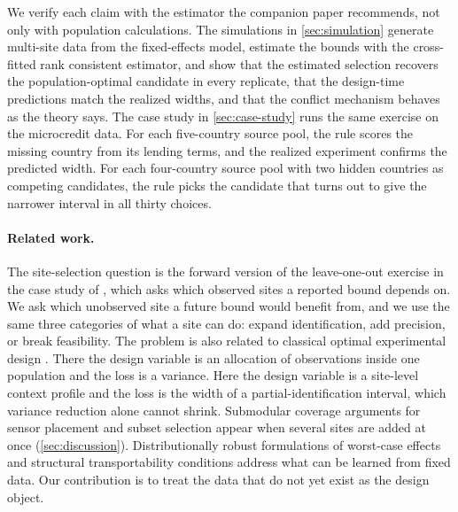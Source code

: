 We verify each claim with the estimator the companion paper recommends,
not only with population calculations. The simulations in
\cref{sec:simulation} generate multi-site data from the fixed-effects
model, estimate the bounds with the cross-fitted rank consistent
estimator, and show that the estimated selection recovers the
population-optimal candidate in every replicate, that the design-time
predictions match the realized widths, and that the conflict mechanism
behaves as the theory says. The case study in \cref{sec:case-study}
runs the same exercise on the microcredit data. For each five-country
source pool, the rule scores the missing country from its lending terms,
and the realized experiment confirms the predicted width. For each
four-country source pool with two hidden countries as competing
candidates, the rule picks the candidate that turns out to give the
narrower interval in all thirty choices.

\paragraph{Related work.}
The site-selection question is the forward version of the leave-one-out
exercise in the case study of \citet{boyarsky2026}, which asks which observed
sites a reported bound depends on. We ask which unobserved site a future
bound would benefit from, and we use the same three categories of what a site can do: expand
identification, add precision, or break feasibility. The problem is also related to classical optimal experimental design \citep{atkinson2007optimum,pukelsheim2006optimal}. There the
design variable is an allocation of observations inside one population
and the loss is a variance. Here the design variable is a site-level
context profile and the loss is the width of a partial-identification
interval, which variance reduction alone cannot shrink. Submodular
coverage arguments for sensor placement and subset selection
\citep{nemhauser1978analysis} appear when several sites are added at
once (\cref{sec:discussion}). Distributionally robust formulations of
worst-case effects \citep{jeong2020assessing} and structural
transportability conditions \citep{bareinboim2016causal} address what
can be learned from fixed data. Our contribution is to treat the data
that do not yet exist as the design object.
